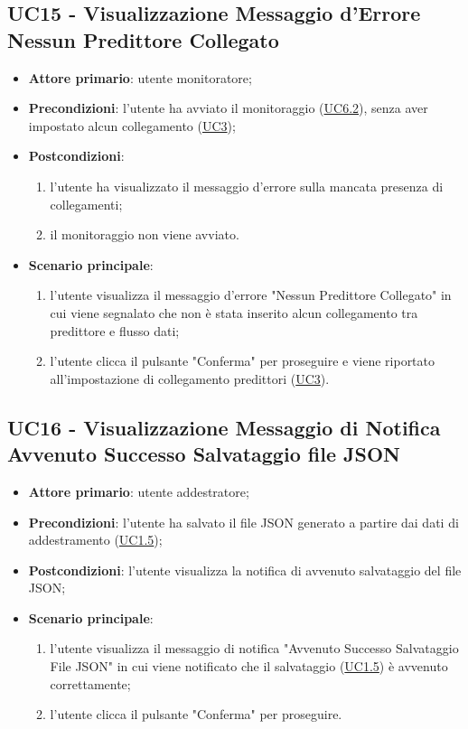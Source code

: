 	\subsection{UC15 - Visualizzazione Messaggio d'Errore Nessun Predittore Collegato}
		\begin{itemize}
			\item\textbf{Attore primario}: utente monitoratore;
			\item\textbf{Precondizioni}: l’utente ha avviato il monitoraggio (\hyperref[par:UC6.2]{UC6.2}), senza aver impostato alcun collegamento (\hyperref[par:UC3]{UC3});
			\item\textbf{Postcondizioni}: 
				\begin{enumerate}
					\item l’utente ha visualizzato il messaggio d'errore sulla mancata presenza di collegamenti;	
					\item	il monitoraggio non viene avviato.
				\end{enumerate}
			\item\textbf{Scenario principale}: 
				\begin{enumerate} 
					\item l’utente visualizza il messaggio d'errore "Nessun Predittore Collegato" in cui viene segnalato che non è stata inserito alcun collegamento tra predittore e flusso dati; 
					\item l'utente clicca il pulsante "Conferma" per proseguire e viene riportato all'impostazione di collegamento predittori (\hyperref[par:UC3]{UC3}).		
				\end{enumerate}		
		\end{itemize}


	\label{par:UC16}
	\subsection{UC16 - Visualizzazione Messaggio di Notifica Avvenuto Successo Salvataggio file JSON}
		\begin{itemize}
			\item\textbf{Attore primario}: utente addestratore;
			\item\textbf{Precondizioni}: l'utente ha salvato il file JSON generato a partire dai dati di addestramento (\hyperref[par:UC1.5]{UC1.5}); 
			\item\textbf{Postcondizioni}: l'utente visualizza la notifica di avvenuto salvataggio del file JSON;					\item\textbf{Scenario principale}: 
				\begin{enumerate} 
					\item l’utente visualizza il messaggio di notifica "Avvenuto Successo Salvataggio File JSON" in cui viene notificato che il salvataggio (\hyperref[par:UC1.5]{UC1.5}) è avvenuto correttamente;
					\item l'utente clicca il pulsante "Conferma" per proseguire.		
				\end{enumerate}		
		\end{itemize}
	
